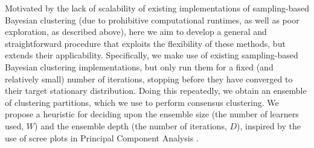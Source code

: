 \documentclass{bmcart}
\newcommand{\commentPDWK}[1]{{\color{black}#1}}
\newcommand{\commentCW}[1]{{\color{black}#1}}
\begin{document}
Motivated by the lack of scalability of existing implementations of sampling-based Bayesian clustering (due to prohibitive computational runtimes, as well as poor exploration, as described above), here we aim to develop a general and straightforward procedure that exploits the flexibility of these methods, but extends their applicability.
 Specifically, we make use of existing sampling-based Bayesian clustering implementations, but only run them for a fixed (and relatively small) number of iterations, stopping before they have converged to their target stationary distribution. Doing this repeatedly, we obtain an ensemble of clustering partitions, which we use to perform consensus clustering. %
We propose a heuristic for deciding upon the ensemble size (the number of learners used, $W$) and the ensemble depth (the number of iterations, $D$), inspired by the use of scree plots in Principal Component Analysis \citep[\textbf{PCA};][]{wold1987principal}.  



\end{document}
